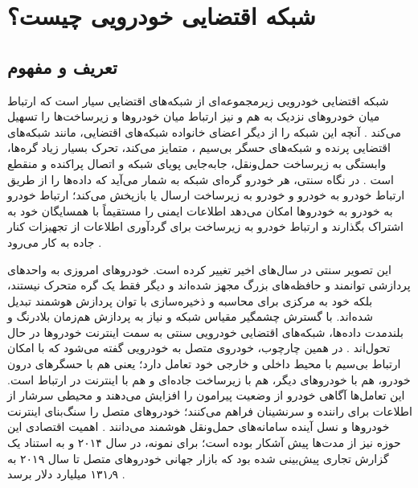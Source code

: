 \section{شبکه اقتضایی خودرویی چیست؟}

\subsection{تعریف و مفهوم}

شبکه اقتضایی خودرویی زیرمجموعه‌ای از شبکه‌های اقتضایی سیار  است که ارتباط میان خودروهای نزدیک به هم و نیز ارتباط میان خودروها و زیرساخت‌ها را تسهیل می‌کند \cite{hozouriOverviewVANETVehicular2023}. آنچه این شبکه را از دیگر اعضای خانواده شبکه‌های اقتضایی، مانند شبکه‌های اقتضایی پرنده  و شبکه‌های حسگر بی‌سیم ، متمایز می‌کند، تحرک بسیار زیاد گره‌ها، وابستگی به زیرساخت حمل‌ونقل، جابه‌جایی پویای شبکه و اتصال پراکنده و منقطع است \cite{hozouriOverviewVANETVehicular2023}. در نگاه سنتی، هر خودرو گره‌ای شبکه به شمار می‌آید که داده‌ها را از طریق ارتباط خودرو به خودرو و خودرو به زیرساخت ارسال یا بازپخش می‌کند؛ ارتباط خودرو به خودرو به خودروها امکان می‌دهد اطلاعات ایمنی را مستقیماً با همسایگان خود به اشتراک بگذارند و ارتباط خودرو به زیرساخت برای گردآوری اطلاعات از تجهیزات کنار جاده به کار می‌رود \cite{xuInternetVehiclesBig2018}.

این تصویر سنتی در سال‌های اخیر تغییر کرده است. خودروهای امروزی به واحدهای پردازشی توانمند و حافظه‌های بزرگ مجهز شده‌اند و دیگر فقط یک گره متحرک نیستند، بلکه خود به مرکزی برای محاسبه و ذخیره‌سازی با توان پردازش هوشمند تبدیل شده‌اند. با گسترش چشمگیر مقیاس شبکه و نیاز به پردازش هم‌زمان بلادرنگ و بلندمدت داده‌ها، شبکه‌های اقتضایی خودرویی سنتی به سمت اینترنت خودروها  در حال تحول‌اند \cite{xuInternetVehiclesBig2018}. در همین چارچوب، خودروی متصل به خودرویی گفته می‌شود که با امکان ارتباط بی‌سیم با محیط داخلی و خارجی خود تعامل دارد؛ یعنی هم با حسگرهای درون خودرو، هم با خودروهای دیگر، هم با زیرساخت جاده‌ای و هم با اینترنت در ارتباط است. این تعامل‌ها آگاهی خودرو از وضعیت پیرامون را افزایش می‌دهند و محیطی سرشار از اطلاعات برای راننده و سرنشینان فراهم می‌کنند؛ خودروهای متصل را سنگ‌بنای اینترنت خودروها و نسل آینده سامانه‌های حمل‌ونقل هوشمند  می‌دانند \cite{luConnectedVehiclesSolutions2014}. اهمیت اقتصادی این حوزه نیز از مدت‌ها پیش آشکار بوده است؛ برای نمونه، در سال ۲۰۱۴ و به استناد یک گزارش تجاری پیش‌بینی شده بود که بازار جهانی خودروهای متصل تا سال ۲۰۱۹ به ۱۳۱٫۹ میلیارد دلار برسد \cite{luConnectedVehiclesSolutions2014}.

